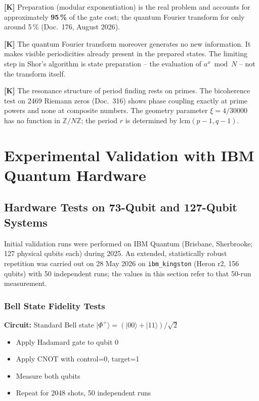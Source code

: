 \textbf{[K]} Preparation (modular exponentiation) is the real problem and
accounts for approximately \textbf{95\,\%} of the gate cost; the
quantum Fourier transform for only around 5\,\% (Doc.~176, August 2026).

\textbf{[K]} The quantum Fourier transform moreover generates no new
information. It makes visible periodicities already present in the prepared
states. The limiting step in Shor's algorithm is state preparation -- the
evaluation of $a^x \bmod N$ -- not the transform itself.

\textbf{[K]} The resonance structure of period finding rests on primes. The
bicoherence test on 2469 Riemann zeros (Doc.~316) shows phase coupling exactly
at prime powers and none at composite numbers. The geometry parameter
$\xi = 4/30000$ has no function in $\mathbb{Z}/N\mathbb{Z}$; the period $r$ is
determined by $\mathrm{lcm}(p-1,q-1)$.

\section{Experimental Validation with IBM Quantum Hardware}
\label{sec:ibm_validation}

\subsection{Hardware Tests on 73-Qubit and 127-Qubit Systems}

Initial validation runs were performed on IBM Quantum (Brisbane, Sherbrooke; 127 physical qubits each) during 2025. An extended, statistically robust repetition was carried out on 28 May 2026 on \texttt{ibm\_kingston} (Heron r2, 156 qubits) with 50 independent runs; the values in this section refer to that 50-run measurement.

\subsubsection{Bell State Fidelity Tests}

\begin{experimentbox}
	\textbf{Circuit:} Standard Bell state $|\Phi^+\rangle = (|00\rangle + |11\rangle)/\sqrt{2}$
	\begin{itemize}
		\item Apply Hadamard gate to qubit 0
		\item Apply CNOT with control=0, target=1
		\item Measure both qubits
		\item Repeat for 2048 shots, 50 independent runs
	\end{itemize}
\end{experimentbox}

